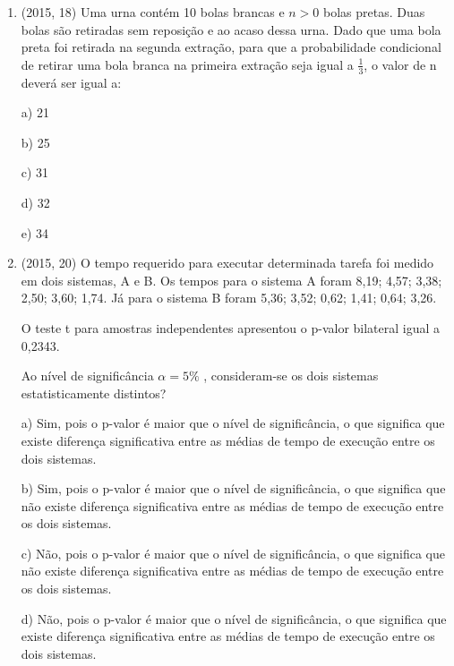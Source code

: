 \documentclass{article}
\begin{document}
\begin{enumerate}
\textbf{CONTEÚDO}

$\rule[1cm]{100cm}{1px}$

a única possibilidade seria permutando os 4 homens primeiro e depois as 6 mulheres


\newpage



\item (2015, 18) Uma urna contém 10 bolas brancas e $n > 0$ bolas pretas. Duas bolas são retiradas sem reposição e ao acaso dessa urna. Dado que uma bola preta foi retirada na segunda extração, para que a probabilidade condicional de retirar uma bola branca na primeira extração seja igual a $\frac{1}{3}$, o valor de n deverá ser igual a:

a) 21

b) 25

c) 31

d) 32

e) 34\newline






\item (2015, 20) O tempo requerido para executar determinada tarefa foi medido em dois sistemas, A e B. Os tempos para o sistema A foram 8,19; 4,57; 3,38; 2,50; 3,60; 1,74. Já para o sistema B foram 5,36; 3,52; 0,62; 1,41; 0,64; 3,26. 

O teste t para amostras independentes apresentou o p-valor bilateral igual a 0,2343.

Ao nível de significância $\alpha=5 \%$ , consideram-se os dois sistemas estatisticamente distintos?\newline

a) Sim, pois o p-valor é maior que o nível de significância, o que significa que existe diferença significativa entre as médias de
tempo de execução entre os dois sistemas.

b) Sim, pois o p-valor é maior que o nível de significância, o que significa que não existe diferença significativa entre as médias
de tempo de execução entre os dois sistemas.

c) Não, pois o p-valor é maior que o nível de significância, o que significa que não existe diferença significativa entre as médias
de tempo de execução entre os dois sistemas.

d) Não, pois o p-valor é maior que o nível de significância, o que significa que existe diferença significativa entre as médias de
tempo de execução entre os dois sistemas.


\end{enumerate}
\end{document}
